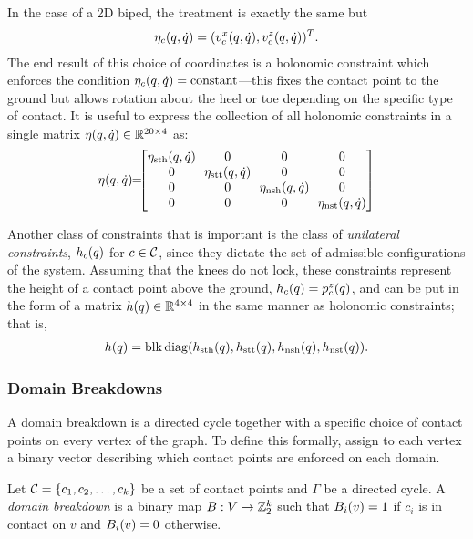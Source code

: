 In the case of a 2D biped, the treatment is exactly the same but
\begin{align*}
  \eta_{c}(q, \dot{q}) = (v_{c}^{x}(q, \dot{q}), v_{c}^{z}(q, \dot{q}))^T.
\end{align*}
%
The end result of this choice of coordinates is a holonomic constraint which
enforces the condition $\eta_{c}(q, \dot{q}) = \mathrm{constant}$---this fixes the
contact point to the ground but allows rotation about the heel or toe depending
on the specific type of contact.
%
It is useful to express the collection of all holonomic constraints in a single
matrix $\eta(q, \dot{q}) \in \mathbb{R}^{20 \times 4}$ as:
\begin{align}
  \eta\argsqdq \!\! = \!\!\! \left[\!\!\begin{array}{c c c c}
    \! \eta_{\sth}\argsqdq \! & 0 & 0 & 0 \\
    0 & \! \eta_{\stt}\argsqdq \! & 0 & 0 \\
    0 & 0 & \! \eta_{\nsh}\argsqdq \! & 0 \\
    0 & 0 & 0 & \! \eta_{\nst}\argsqdq \!
    \end{array}\!\!\right]
\end{align}

Another class of constraints that is important is the class of {\it unilateral
  constraints}, $h_{c}(q)$ for $c \in \mathcal{C}$, since they dictate the set of
admissible configurations of the system.
%
Assuming that the knees do not lock, these constraints represent the height of a
contact point above the ground, $h_{c}(q) = p_{c}^{z}(q)$, and can be put
in the form of a matrix $h(q) \in \mathbb{R}^{4 \times 4}$ in the same manner as
holonomic constraints;
%
that is,
\begin{align*}
  h(q) = \operatorname*{blk\,diag}(h_{\mathrm{sth}}(q), h_{\mathrm{stt}}(q), h_{\mathrm{nsh}}(q),
  h_{\mathrm{nst}}(q)).
\end{align*}



\subsubsection{Domain Breakdowns}

A domain breakdown is a directed cycle together with a specific choice of
contact points on every vertex of the graph.
%
To define this formally, assign to each vertex a binary vector describing which
contact points are enforced on each domain.

\gap

\begin{definition}
  \label{def:domainbreakdown}
  Let $\mathcal{C} = \{c_{1}, c_{2}, \ldots, c_{k}\}$ be a set of contact points and $\Gamma$ be a directed cycle.
  A {\it domain breakdown} is a binary map $B : V \to \mathbb{Z}_{2}^{k}$ such that $B_{i}(v) = 1$ if $c_{i}$ is in contact on $v$ and $B_{i}(v) = 0$ otherwise.
\end{definition}

